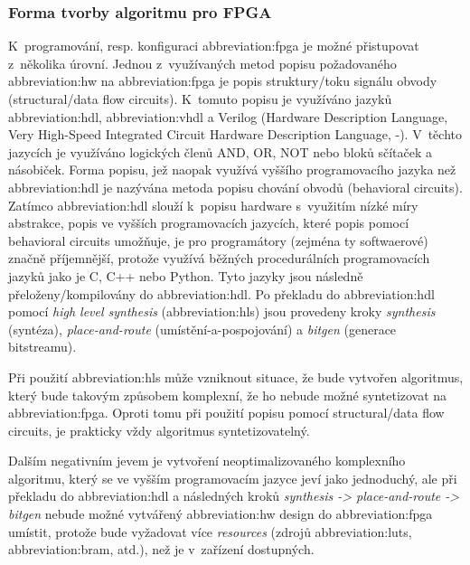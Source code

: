 \documentclass[a4paper, twoside, 11pt]{article}
\begin{document}
		\subsubsection{Forma tvorby algoritmu pro FPGA}\label{subsubsec:forma-tvorby-algoritmu-pro-fpga}
		K~programování, resp. konfiguraci \gls{abbreviation:fpga} je možné přistupovat z~několika úrovní. Jednou z~využívaných metod popisu požadovaného \gls{abbreviation:hw} na \gls{abbreviation:fpga} je popis struktury/toku signálu obvody (structural/data flow circuits). K~tomuto popisu je využíváno jazyků \gls{abbreviation:hdl}, \gls{abbreviation:vhdl} a Verilog (Hardware Description Language, Very High-Speed Integrated Circuit Hardware Description Language, -). V~těchto jazycích je využíváno logických členů AND, OR, NOT nebo bloků sčítaček a násobiček. Forma popisu, jež naopak využívá vyššího programovacího jazyka než \gls{abbreviation:hdl} je nazývána metoda popisu chování obvodů (behavioral circuits). Zatímco \gls{abbreviation:hdl} slouží k~popisu hardware s~využitím nízké míry abstrakce, popis ve vyšších programovacích jazycích, které popis pomocí behavioral circuits umožňuje, je pro programátory (zejména ty softwaerové) značně příjemnější, protože využívá běžných procedurálních programovacích jazyků jako je C, C++ nebo Python. Tyto jazyky jsou následně přeloženy/kompilovány do \gls{abbreviation:hdl}. Po překladu do \gls{abbreviation:hdl} pomocí \textit{high level synthesis} (\gls{abbreviation:hls}) jsou provedeny kroky \textit{synthesis} (syntéza), \textit{place-and-route} (umístění-a-pospojování) a \textit{bitgen} (generace bitstreamu). \cite{Sass2010}\par
		Při použití \gls{abbreviation:hls} může vzniknout situace, že bude vytvořen algoritmus, který bude takovým způsobem komplexní, že ho nebude možné syntetizovat na \gls{abbreviation:fpga}. Oproti tomu při použití popisu pomocí structural/data flow circuits, je prakticky vždy algoritmus syntetizovatelný. \cite{Sass2010}\par
		Dalším negativním jevem je vytvoření neoptimalizovaného komplexního algoritmu, který se ve vyšším programovacím jazyce jeví jako jednoduchý, ale při překladu do \gls{abbreviation:hdl} a následných kroků \textit{synthesis -> place-and-route -> bitgen} nebude možné vytvářený \gls{abbreviation:hw} design do \gls{abbreviation:fpga} umístit, protože bude vyžadovat více \textit{resources} (zdrojů \gls{abbreviation:luts}, \gls{abbreviation:bram}, atd.), než je v~zařízení dostupných.\par
\end{document}
